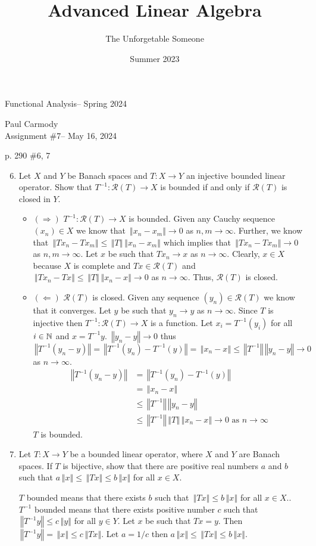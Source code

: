 \documentclass[10pt,a4paper]{report}
\title{Advanced Linear Algebra}
\author{The Unforgetable Someone}
\date{Summer 2023}
\newcommand{\CLASSNAME}{Functional Analysis}
\newcommand{\STUDENTNAME}{Paul Carmody}
\newcommand{\ASSIGNMENT}{Assignment \#7}
\newcommand{\DUEDATE}{May 16, 2024}
\newcommand{\SEMESTER}{Spring 2024}
\newcommand{\NORM}[1]{\,\left \Vert #1 \right \Vert}
\begin{document}
\begin{center}
	\Large{\CLASSNAME -- \SEMESTER} \\
\end{center}
\begin{center}
	\STUDENTNAME \\
	\ASSIGNMENT -- \DUEDATE\\
\end{center} 


p. 290 \#6, 7 
\begin{enumerate}
	\setcounter{enumi}{5}
	\item Let $X$ and $Y$ be Banach spaces and $T: X \to Y$ an injective bounded linear operator.  Show that $T^{-1}:\mathcal{R}(T) \to X$ is bounded if and only if $\mathcal{R}(T)$ is closed in $Y$.
	
	\begin{itemize}
		\item $(\Rightarrow)$ $T^{-1}:\mathcal{R}(T) \to X$ is bounded. Given any Cauchy sequence $(x_n) \in X$ we know that $\NORM{x_n - x_m} \to 0$ as $n,m \to \infty$.  Further, we know that $\NORM{Tx_n-Tx_m} \le \NORM{T}\NORM{x_n - x_m}$ which implies that $\NORM{Tx_n-Tx_m} \to 0$ as $n,m \to \infty$.  Let $x$ be such that $Tx_n \to x$ as $n \to \infty$.  Clearly, $x \in X$ because $X$ is complete and $Tx \in \mathcal{R}(T)$ and $\NORM{Tx_n-Tx} \le \NORM{T}\NORM{x_n-x} \to 0$ as $n \to \infty$.  Thus, $\mathcal{R}(T)$ is closed.
		\item $(\Leftarrow)$ $\mathcal{R}(T)$ is closed.  Given any sequence $(y_n) \in \mathcal{R}(T)$ we know that it converges. Let $y $ be such that $y_n \to y$ as $n\to \infty$.  Since $T$ is injective then $T^{-1}: \mathcal{R}(T) \to X$ is a function.  Let $x_i = T^{-1}(y_i)$ for all $i \in \mathbb{N}$ and $x = T^{-1}y$.  $\NORM{y_n - y} \to 0$ thus $\NORM{T^{-1}(y_n -y)} = \NORM{T^{-1}(y_n)-T^{-1}(y)}= \NORM{x_n - x} \le \NORM{T^{-1}}\NORM{y_n - y} \to 0$ as $n \to \infty$.
		\begin{align*}
			\NORM{T^{-1}(y_n -y)} &= \NORM{T^{-1}(y_n)-T^{-1}(y)} \\
			&= \NORM{x_n - x} \\
			&\le \NORM{T^{-1}}\NORM{y_n - y} \\
			&\le \NORM{T^{-1}}\NORM{T}\NORM{x_n - x} \to 0 \text{ as } n \to \infty
		\end{align*}$T$ is bounded.
	\end{itemize}
	
	\item Let $T: X \to Y$ be a bounded linear operator, where $X$ and $Y$ are Banach spaces.  If $T$ is bijective, show that there are positive real numbers $a$ and $b$ such that $a \NORM{x} \le \NORM{Tx}\le b  \NORM{x}$ for all $ x \in X$.
	
	$T$ bounded means that there exists $b$ such that $\NORM{Tx} \le b \NORM{x}$ for all $x \in X$.. $T^{-1}$ bounded means that there exists positive number $c$ such that $\NORM{T^{-1}y} \le c \NORM{y}$ for all $y \in Y$.  Let $x$ be such that $Tx = y$.  Then $\NORM{T^{-1}y} = \NORM{x} \le c \NORM{Tx}$.  Let $a = 1/c$ then $a \NORM{x} \le \NORM{Tx} \le b\NORM{x}.$
	
\end{enumerate}
\end{document}
